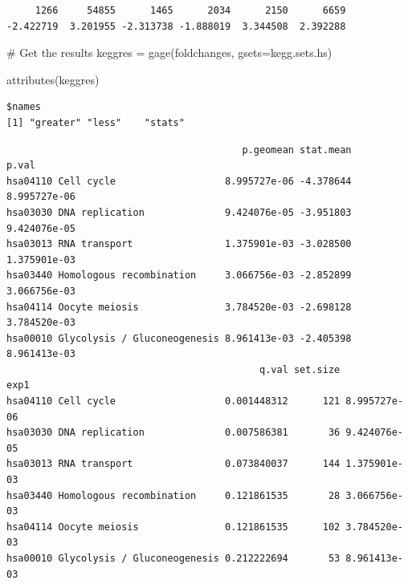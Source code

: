 \documentclass[
  letterpaper,
  DIV=11,
  numbers=noendperiod]{scrartcl}
\newenvironment{Shaded}{\begin{snugshade}}{\end{snugshade}}
\newcommand{\AttributeTok}[1]{\textcolor[rgb]{0.40,0.45,0.13}{#1}}
\newcommand{\CommentTok}[1]{\textcolor[rgb]{0.37,0.37,0.37}{#1}}
\newcommand{\FunctionTok}[1]{\textcolor[rgb]{0.28,0.35,0.67}{#1}}
\newcommand{\NormalTok}[1]{\textcolor[rgb]{0.00,0.23,0.31}{#1}}
\newcommand{\OtherTok}[1]{\textcolor[rgb]{0.00,0.23,0.31}{#1}}
\newcommand{\SpecialCharTok}[1]{\textcolor[rgb]{0.37,0.37,0.37}{#1}}
\begin{document}
\begin{verbatim}
     1266     54855      1465      2034      2150      6659 
-2.422719  3.201955 -2.313738 -1.888019  3.344508  2.392288 
\end{verbatim}

\begin{Shaded}
\begin{Highlighting}[]
\CommentTok{\# Get the results}
\NormalTok{keggres }\OtherTok{=} \FunctionTok{gage}\NormalTok{(foldchanges, }\AttributeTok{gsets=}\NormalTok{kegg.sets.hs)}
\end{Highlighting}
\end{Shaded}

\begin{Shaded}
\begin{Highlighting}[]
\FunctionTok{attributes}\NormalTok{(keggres)}
\end{Highlighting}
\end{Shaded}

\begin{verbatim}
$names
[1] "greater" "less"    "stats"  
\end{verbatim}

\begin{Shaded}
\end{Shaded}

\begin{verbatim}
                                         p.geomean stat.mean        p.val
hsa04110 Cell cycle                   8.995727e-06 -4.378644 8.995727e-06
hsa03030 DNA replication              9.424076e-05 -3.951803 9.424076e-05
hsa03013 RNA transport                1.375901e-03 -3.028500 1.375901e-03
hsa03440 Homologous recombination     3.066756e-03 -2.852899 3.066756e-03
hsa04114 Oocyte meiosis               3.784520e-03 -2.698128 3.784520e-03
hsa00010 Glycolysis / Gluconeogenesis 8.961413e-03 -2.405398 8.961413e-03
                                            q.val set.size         exp1
hsa04110 Cell cycle                   0.001448312      121 8.995727e-06
hsa03030 DNA replication              0.007586381       36 9.424076e-05
hsa03013 RNA transport                0.073840037      144 1.375901e-03
hsa03440 Homologous recombination     0.121861535       28 3.066756e-03
hsa04114 Oocyte meiosis               0.121861535      102 3.784520e-03
hsa00010 Glycolysis / Gluconeogenesis 0.212222694       53 8.961413e-03
\end{verbatim}
\end{document}
